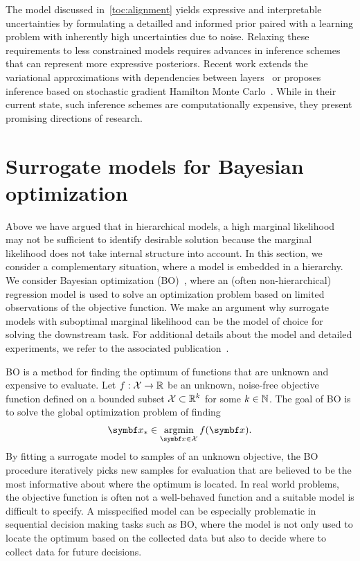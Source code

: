 The model discussed in~\cref{toc:alignment} yields expressive and interpretable uncertainties by formulating a detailled and informed prior paired with a learning problem with inherently high uncertainties due to noise.
Relaxing these requirements to less constrained models requires advances in inference schemes that can represent more expressive posteriors.
Recent work extends the variational approximations with dependencies between layers~\parencite{ustyuzhaninov_compositional_2020} or proposes inference based on stochastic gradient Hamilton Monte Carlo~\parencite{havasi_inference_2018}.
While in their current state, such inference schemes are computationally expensive, they present promising directions of research.

\section{Surrogate models for Bayesian optimization}
\label{toc:discussion:bo}
Above we have argued that in hierarchical models, a high marginal likelihood may not be sufficient to identify desirable solution because the marginal likelihood does not take internal structure into account.
In this section, we consider a complementary situation, where a model is embedded in a hierarchy.
We consider Bayesian optimization (BO)~\parencite{snoek_practical_2012}, where an (often non-hierarchical) regression model is used to solve an optimization problem based on limited observations of the objective function.
We make an argument why surrogate models with suboptimal marginal likelihood can be the model of choice for solving the downstream task.
For additional details about the model and detailed experiments, we refer to the associated publication~\parencite{bodin_modulating_2020}.

BO is a method for finding the optimum of functions that are unknown and expensive to evaluate.
Let $f : \mathcal{X} \to \mathbb{R}$ be an unknown, noise-free objective function defined on a bounded subset $\mathcal{X} \subset \mathbb{R}^k$ for some $k \in \mathbb{N}$.
The goal of BO is to solve the global optimization problem of finding
\begin{align}
    \mat{x}_\ast \in \argmin_{\mat{x} \in \Xc} f(\mat{x}).
\end{align}
By fitting a surrogate model to samples of an unknown objective, the BO procedure iteratively picks new samples for evaluation that are believed to be the most informative about where the optimum is located.
In real world problems, the objective function is often not a well-behaved function and a suitable model is difficult to specify.
A misspecified model can be especially problematic in sequential decision making tasks such as BO, where the model is not only used to locate the optimum based on the collected data but also to decide where to collect data for future decisions.


